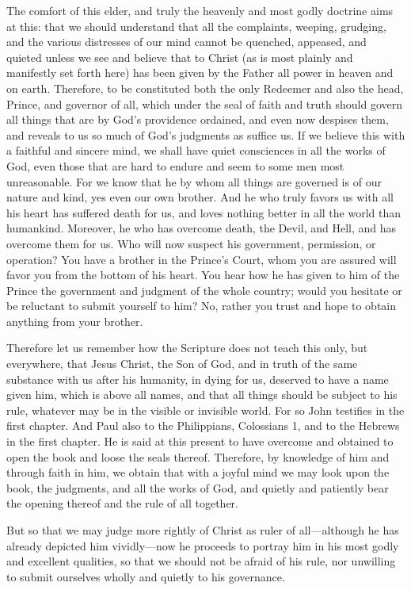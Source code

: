 The comfort of this elder, and truly the heavenly and most godly doctrine aims at this: that we should understand that all the complaints, weeping, grudging, and the various distresses of our mind cannot be quenched, appeased, and quieted unless we see and believe that to Christ (as is most plainly and manifestly set forth here) has been given by the Father all power in heaven and on earth. Therefore, to be constituted both the only Redeemer and also the head, Prince, and governor of all, which under the seal of faith and truth should govern all things that are by God’s providence ordained, and even now despises them, and reveals to us so much of God’s judgments as suffice us. If we believe this with a faithful and sincere mind, we shall have quiet consciences in all the works of God, even those that are hard to endure and seem to some men most unreasonable. For we know that he by whom all things are governed is of our nature and kind, yes even our own brother. And he who truly favors us with all his heart has suffered death for us, and loves nothing better in all the world than humankind. Moreover, he who has overcome death, the Devil, and Hell, and has overcome them for us. Who will now suspect his government, permission, or operation? You have a brother in the Prince’s Court, whom you are assured will favor you from the bottom of his heart. You hear how he has given to him of the Prince the government and judgment of the whole country; would you hesitate or be reluctant to submit yourself to him? No, rather you trust and hope to obtain anything from your brother.

Therefore let us remember how the Scripture does not teach this only, but everywhere, that Jesus Christ, the Son of God, and in truth of the same substance with us after his humanity, in dying for us, deserved to have a name given him, which is above all names, and that all things should be subject to his rule, whatever may be in the visible or invisible world. For so John testifies in the first chapter. And Paul also to the Philippians, Colossians 1, and to the Hebrews in the first chapter. He is said at this present to have overcome and obtained to open the book and loose the seals thereof. Therefore, by knowledge of him and through faith in him, we obtain that with a joyful mind we may look upon the book, the judgments, and all the works of God, and quietly and patiently bear the opening thereof and the rule of all together.

But so that we may judge more rightly of Christ as ruler of all—although he has already depicted him vividly—now he proceeds to portray him in his most godly and excellent qualities, so that we should not be afraid of his rule, nor unwilling to submit ourselves wholly and quietly to his governance.

